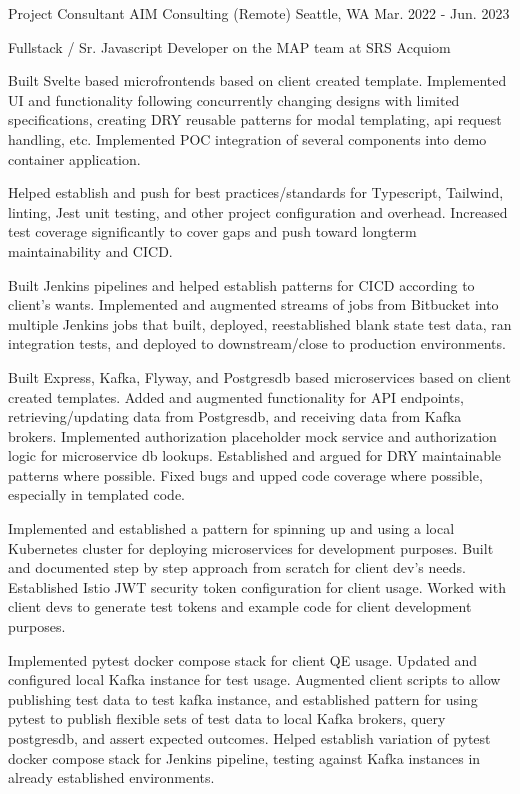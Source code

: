 \begin{cventries}
\cventry
  {Project Consultant} %
  {AIM Consulting (Remote)} %
  {Seattle, WA} %
  {Mar. 2022 - Jun. 2023} %
  {
    \begin{cvitems} %
      \item[] {Fullstack / Sr. Javascript Developer on the MAP team at SRS Acquiom}
      \item[]
      \item {Built Svelte based microfrontends based on client created template. Implemented UI and functionality following concurrently changing designs with limited specifications, creating DRY reusable patterns for modal templating, api request handling, etc. Implemented POC integration of several components into demo container application.}
      \item {Helped establish and push for best practices/standards for Typescript, Tailwind, linting, Jest unit testing, and other project configuration and overhead. Increased test coverage significantly to cover gaps and push toward longterm maintainability and CICD.}
      \item {Built Jenkins pipelines and helped establish patterns for CICD according to client's wants. Implemented and augmented streams of jobs from Bitbucket into multiple Jenkins jobs that built, deployed, reestablished blank state test data, ran integration tests, and deployed to downstream/close to production environments.}
      \item {Built Express, Kafka, Flyway, and Postgresdb based microservices based on client created templates. Added and augmented functionality for API endpoints, retrieving/updating data from Postgresdb, and receiving data from Kafka brokers. Implemented authorization placeholder mock service and authorization logic for microservice db lookups. Established and argued for DRY maintainable patterns where possible. Fixed bugs and upped code coverage where possible, especially in templated code.}
      \item {Implemented and established a pattern for spinning up and using a local Kubernetes cluster for deploying microservices for development purposes. Built and documented step by step approach from scratch for client dev's needs. Established Istio JWT security token configuration for client usage. Worked with client devs to generate test tokens and example code for client development purposes.}
      \item {Implemented pytest docker compose stack for client QE usage. Updated and configured local Kafka instance for test usage. Augmented client scripts to allow publishing test data to test kafka instance, and established pattern for using pytest to publish flexible sets of test data to local Kafka brokers, query postgresdb, and assert expected outcomes. Helped establish variation of pytest docker compose stack for Jenkins pipeline, testing against Kafka instances in already established environments.}
    \end{cvitems}
  }


\end{cventries}
